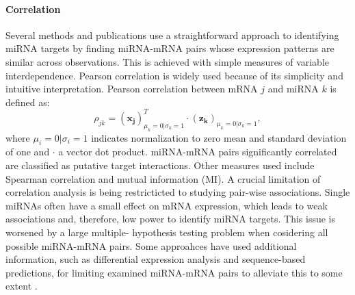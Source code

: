 \paragraph{Correlation}
Several methods and publications use a straightforward approach to identifying
miRNA targets by finding miRNA-mRNA pairs whose expression patterns are
similar across observations. This is achieved with simple measures of variable
interdependence. Pearson correlation is widely used because of its simplicity
and intuitive interpretation. Pearson correlation between mRNA $j$ and miRNA
$k$ is defined as:
\begin{equation}
	\rho_{jk} = (\mathbf{x_j})_{\mu_k=0|\sigma_k=1}^T \cdot (\mathbf{z_k})_{\mu_k=0|\sigma_k=1},
	\label{eq:pearson}
\end{equation}
where $\mu_i=0|\sigma_i=1$ indicates normalization to zero mean and standard
deviation of one and $\cdot$ a vector dot product. miRNA-mRNA pairs
significantly correlated are classified as putative target interactions. Other
measures used include Spearman correlation and mutual information (MI). A
crucial limitation of correlation analysis is being restricticted to studying
pair-wise associations. Single miRNAs often have a small effect on mRNA
expression, which leads to weak associations and, therefore, low power to
identify miRNA targets. This issue is worsened by a large multiple-
hypothesis testing problem when cosidering all possible miRNA-mRNA pairs.
Some approahces have used additional information, such as differential expression
analysis and sequence-based predictions, for limiting examined miRNA-mRNA pairs
to alleviate this to some extent \citep{Muniategui2013}.

